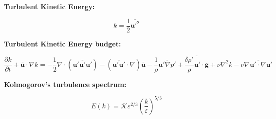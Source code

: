 \documentclass[12pt]{article}
\numberwithin{equation}{section}
\numberwithin{figure}{section}
\numberwithin{table}{section}
\begin{document}
\textbf{Turbulent Kinetic Energy:}

\begin{equation}
  k = \frac{1}{2} \overline{\mathbf{u}'^2}
\end{equation}

\textbf{Turbulent Kinetic Energy budget:}

\begin{equation}
  \frac{\partial k}{\partial t} + \overline{\mathbf{u}} \cdot \nabla k =
  - \frac{1}{2} \nabla \cdot (\overline{\mathbf{u}' \mathbf{u}' \mathbf{u}'})
  - (\overline{\mathbf{u}' \mathbf{u}'} \cdot \nabla) \overline{\mathbf{u}}
  - \frac{1}{\rho} \overline{\mathbf{u}' \nabla p'}
  + \overline{\frac{\delta \rho'}{\rho} \mathbf{u}' \cdot \mathbf{g}}
  + \nu \nabla^2 k
  - \nu \overline{\nabla \mathbf{u}' \cdot \nabla \mathbf{u}'}
\end{equation}

\textbf{Kolmogorov's turbulence spectrum:}

\begin{equation}
  E(k) = \mathcal{K} \varepsilon^{2/3} \left( \frac{k}{\varepsilon} \right)^{5/3}
\end{equation}

\printindex
\end{document}

